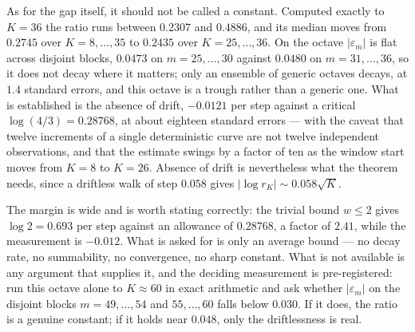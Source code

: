 \documentclass[11pt]{article}
\theoremstyle{remark}
\newcommand{\eps}{\varepsilon}
\begin{document}
As for the gap itself, it should not be called a constant. Computed exactly to $K=36$ the ratio runs
between $0.2307$ and $0.4886$, and its median moves from $0.2745$ over $K=8,\dots,35$ to $0.2435$ over
$K=25,\dots,36$. On the octave $|\eps_m|$ is flat across disjoint blocks, $0.0473$ on $m=25,\dots,30$
against $0.0480$ on $m=31,\dots,36$, so it does not decay where it matters; only an ensemble of generic
octaves decays, at $1.4$ standard errors, and this octave is a trough rather than a generic one. What is
established is the absence of drift, $-0.0121$ per step against a critical $\log(4/3)=0.28768$, at about
eighteen standard errors --- with the caveat that twelve increments of a single deterministic curve are
not twelve independent observations, and that the estimate swings by a factor of ten as the window start
moves from $K=8$ to $K=26$. Absence of drift is nevertheless what the theorem needs, since a driftless
walk of step $0.058$ gives $|\log r_K|\sim0.058\sqrt K$.

The margin is wide and is worth stating correctly: the trivial bound $w\le2$ gives $\log2=0.693$ per step
against an allowance of $0.28768$, a factor of $2.41$, while the measurement is $-0.012$. What is asked
for is only an average bound --- no decay rate, no summability, no convergence, no sharp constant. What
is not available is any argument that supplies it, and the deciding measurement is pre-registered: run
this octave alone to $K\approx60$ in exact arithmetic and ask whether $|\eps_m|$ on the disjoint blocks
$m=49,\dots,54$ and $55,\dots,60$ falls below $0.030$. If it does, the ratio is a genuine constant; if it
holds near $0.048$, only the driftlessness is real.
\end{document}
